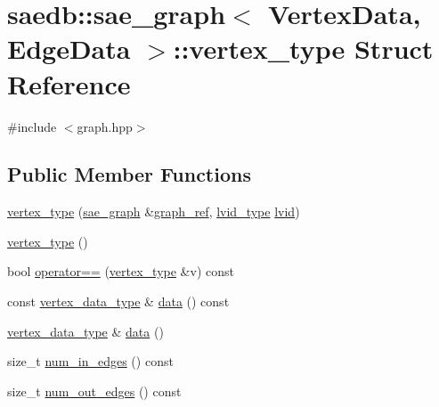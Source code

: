 \hypertarget{structsaedb_1_1sae__graph_1_1vertex__type}{\section{saedb\-:\-:sae\-\_\-graph$<$ Vertex\-Data, Edge\-Data $>$\-:\-:vertex\-\_\-type Struct Reference}
\label{d1/d90/structsaedb_1_1sae__graph_1_1vertex__type}
}


{\ttfamily \#include $<$graph.\-hpp$>$}

\subsection*{Public Member Functions}
\begin{DoxyCompactItemize}
\item 
\hyperlink{structsaedb_1_1sae__graph_1_1vertex__type_ab6014b10ce17d692e923dec61d0da1cc}{vertex\-\_\-type} (\hyperlink{classsaedb_1_1sae__graph}{sae\-\_\-graph} \&\hyperlink{structsaedb_1_1sae__graph_1_1vertex__type_a5977862a541ff4fe90999fbf49d287dd}{graph\-\_\-ref}, \hyperlink{classsaedb_1_1sae__graph_afcd2ad6444e374e40a7a5ee4c46be052}{lvid\-\_\-type} \hyperlink{structsaedb_1_1sae__graph_1_1vertex__type_a580dbdb1a1037a94f7ee66d942d679cc}{lvid})
\item 
\hyperlink{structsaedb_1_1sae__graph_1_1vertex__type_a94f186a7bf16ef32e86d15b3eca4c220}{vertex\-\_\-type} ()
\item 
bool \hyperlink{structsaedb_1_1sae__graph_1_1vertex__type_acb6817d125e4c5e7dadf0df0beb1ba92}{operator==} (\hyperlink{structsaedb_1_1sae__graph_1_1vertex__type}{vertex\-\_\-type} \&v) const 
\item 
const \hyperlink{classsaedb_1_1sae__graph_a8e9dfeb979f49c35d427f364fb3f69f5}{vertex\-\_\-data\-\_\-type} \& \hyperlink{structsaedb_1_1sae__graph_1_1vertex__type_a794a1ed375ecbe057d1bb6b9e63eb9d8}{data} () const 
\item 
\hyperlink{classsaedb_1_1sae__graph_a8e9dfeb979f49c35d427f364fb3f69f5}{vertex\-\_\-data\-\_\-type} \& \hyperlink{structsaedb_1_1sae__graph_1_1vertex__type_a23a4c9c51691ba351ef0d5ad573051a6}{data} ()
\item 
size\-\_\-t \hyperlink{structsaedb_1_1sae__graph_1_1vertex__type_af64b2e0509849b27df833fe2c4bbfd93}{num\-\_\-in\-\_\-edges} () const 
\item 
size\-\_\-t \hyperlink{structsaedb_1_1sae__graph_1_1vertex__type_aea5f50d441f1b97d83e4bcd0137760d2}{num\-\_\-out\-\_\-edges} () const 

\end{DoxyCompactItemize}
